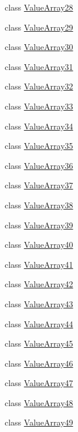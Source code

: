 \begin{DoxyCompactItemize}
class \hyperlink{classtesting_1_1internal_1_1ValueArray28}{Value\-Array28}
\item 
class \hyperlink{classtesting_1_1internal_1_1ValueArray29}{Value\-Array29}
\item 
class \hyperlink{classtesting_1_1internal_1_1ValueArray30}{Value\-Array30}
\item 
class \hyperlink{classtesting_1_1internal_1_1ValueArray31}{Value\-Array31}
\item 
class \hyperlink{classtesting_1_1internal_1_1ValueArray32}{Value\-Array32}
\item 
class \hyperlink{classtesting_1_1internal_1_1ValueArray33}{Value\-Array33}
\item 
class \hyperlink{classtesting_1_1internal_1_1ValueArray34}{Value\-Array34}
\item 
class \hyperlink{classtesting_1_1internal_1_1ValueArray35}{Value\-Array35}
\item 
class \hyperlink{classtesting_1_1internal_1_1ValueArray36}{Value\-Array36}
\item 
class \hyperlink{classtesting_1_1internal_1_1ValueArray37}{Value\-Array37}
\item 
class \hyperlink{classtesting_1_1internal_1_1ValueArray38}{Value\-Array38}
\item 
class \hyperlink{classtesting_1_1internal_1_1ValueArray39}{Value\-Array39}
\item 
class \hyperlink{classtesting_1_1internal_1_1ValueArray40}{Value\-Array40}
\item 
class \hyperlink{classtesting_1_1internal_1_1ValueArray41}{Value\-Array41}
\item 
class \hyperlink{classtesting_1_1internal_1_1ValueArray42}{Value\-Array42}
\item 
class \hyperlink{classtesting_1_1internal_1_1ValueArray43}{Value\-Array43}
\item 
class \hyperlink{classtesting_1_1internal_1_1ValueArray44}{Value\-Array44}
\item 
class \hyperlink{classtesting_1_1internal_1_1ValueArray45}{Value\-Array45}
\item 
class \hyperlink{classtesting_1_1internal_1_1ValueArray46}{Value\-Array46}
\item 
class \hyperlink{classtesting_1_1internal_1_1ValueArray47}{Value\-Array47}
\item 
class \hyperlink{classtesting_1_1internal_1_1ValueArray48}{Value\-Array48}
\item 
class \hyperlink{classtesting_1_1internal_1_1ValueArray49}{Value\-Array49}

\end{DoxyCompactItemize}
